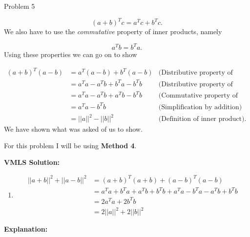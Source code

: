 \begin{problem}{Problem 5}
\begin{highlight}
        \setcounter{equation}{0}
        \begin{equation}
            (a + b)^{T}c = a^{T}c + b^{T}c.
        \end{equation}
        We also have to use the \textit{commutative} property of inner products, namely

        \begin{equation}
            a^{T}b = b^{T}a.
        \end{equation}
        Using these properties we can go on to show

        \begin{align}
            (a+b)^{T}(a-b) & = a^{T}(a-b) + b^{T}(a-b) & \text{(Distributive property of inner products)} \\
            & = a^{T}a - a^{T}b + b^{T}a - b^{T}b & \text{(Distributive property of inner products)} \\
            & = a^{T}a - a^{T}b + a^{T}b - b^{T}b & \text{(Commutative property of inner products)} \\
            & = a^{T}a - b^{T}b & \text{(Simplification by addition)} \\
            & = ||a||^{2} - ||b||^{2} & \text{(Definition of inner product)}.
        \end{align}
        We have shown what was asked of us to show.
    \end{highlight}

    \begin{highlight}
        For this problem I will be using \textbf{Method 4}. \vspace*{1em}

        \textbf{VMLS Solution:}

        \begin{enumerate}[label=(\alph*), start=2]
            \item 
            \begin{align*}
                ||a + b||^{2} + ||a - b||^{2} & = (a + b)^{T}(a + b) + (a - b)^{T}(a - b) \\
                & = a^{T}a + b^{T}a + a^{T}b + b^{T}b + a^{T}a - b^{T}a - a^{T}b + b^{T}b \\
                & = 2a^{T}a + 2b^{T}b \\
                & = 2||a||^{2} + 2||b||^{2}
            \end{align*}
        \end{enumerate}

        \textbf{Explanation:} \vspace*{1em}


\end{highlight}
\end{problem}
